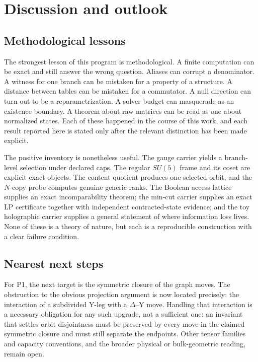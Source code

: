 \documentclass[11pt]{article}
\theoremstyle{definition}
\begin{document}
 \section{Discussion and outlook}\label{discussion-and-outlook}

\subsection{Methodological lessons}\label{what-the-corrections-change}

The strongest lesson of this program is methodological. A finite computation can be exact and still answer the wrong
question. Aliases can corrupt a denominator. A witness for one branch can be mistaken for a property of a structure. A
distance between tables can be mistaken for a commutator. A null direction can turn out to be a reparametrization. A
solver budget can masquerade as an existence boundary. A theorem about raw matrices can be read as one about normalized
states. Each of these happened in the course of this work, and each result reported here is stated only after the
relevant distinction has been made explicit.

The positive inventory is nonetheless useful. The gauge carrier yields a branch-level selection under declared caps.
The regular \(SU(5)\) frame and its coset are explicit exact objects. The content quotient produces one selected orbit,
and the \(N\)-copy probe computes genuine generic ranks. The Boolean access lattice supplies an exact incomparability
theorem; the min-cut carrier supplies an exact LP certificate together with independent contracted-state evidence;
and the toy holographic carrier supplies a general statement of where information loss lives. None of these is a
theory of nature, but each is a reproducible construction with a clear failure condition.

\subsection{Nearest next steps}\label{nearest-upgrades-precisely-typed-open-problems}

For P1, the next target is the symmetric closure of the graph moves. The obstruction to the obvious projection
argument is now located precisely: the interaction of a subdivided Y-leg with a \(\Delta\)--Y move. Handling that
interaction is a necessary obligation for any such upgrade, not a sufficient one: an invariant that settles orbit
disjointness must be preserved by every move in the claimed symmetric closure and must still separate the endpoints. Other
tensor families and capacity conventions, and the broader physical or bulk-geometric reading, remain open.
\end{document}
